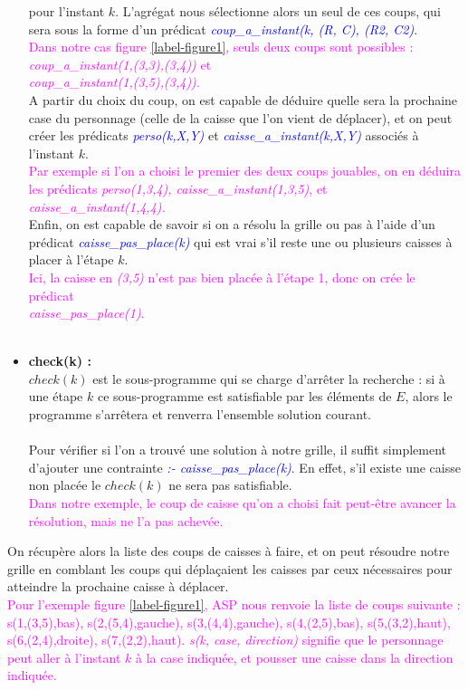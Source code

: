 \documentclass[10pt,a4paper]{article}
\begin{document}
\begin{itemize}
		pour l'instant $k$. L'agrégat nous sélectionne alors un seul de ces coups, qui sera sous la forme d'un prédicat \emph{\textcolor{blue}{coup\_a\_instant(k, (R, C), (R2, C2)}}.\\
		\textcolor{magenta}{Dans notre cas figure \ref{label-figure1}, seuls deux coups sont possibles : \emph{coup\_a\_instant(1,(3,3),(3,4))} et \\
		\emph{coup\_a\_instant(1,(3,5),(3,4)).}}\\
		A partir du choix du coup, on est capable de déduire quelle sera la prochaine case du personnage (celle de la caisse que l'on vient de déplacer), et on peut créer les prédicats 
		\emph{\textcolor{blue}{perso(k,X,Y)}} et \emph{\textcolor{blue}{caisse\_a\_instant(k,X,Y)}} associés à l'instant $k$.\\
		\textcolor{magenta}{Par exemple si l'on a choisi le premier des deux coups jouables, on en déduira les prédicats \emph{perso(1,3,4), caisse\_a\_instant(1,3,5)}, et \emph{caisse\_a\_instant(1,4,4).}}\\
		Enfin, on est capable de savoir si on a résolu la grille ou pas à l'aide d'un prédicat \emph{\textcolor{blue}{caisse\_pas\_place(k)}} qui est vrai s'il reste une ou plusieurs caisses à placer à l'étape $k$.\\
		\textcolor{magenta}{Ici, la caisse en \emph{(3,5)} n'est pas bien placée à l'étape 1, donc on crée le prédicat \\
		\emph{caisse\_pas\_place(1)}.}\\ \\
	\item \textbf{check(k) :}\\
		$check(k)$ est le sous-programme qui se charge d'arrêter la recherche : si à une étape $k$ ce sous-programme est satisfiable par les éléments de $E$, alors le programme s'arrêtera et renverra l'ensemble solution 
		courant.\\ \\
		Pour vérifier si l'on a trouvé une solution à notre grille, il suffit simplement d'ajouter une contrainte \emph{\textcolor{blue}{:- caisse\_pas\_place(k)}}. En effet, s'il existe une caisse non placée le 
		$check(k)$ ne sera pas satisfiable.\\
		\textcolor{magenta}{Dans notre exemple, le coup de caisse qu'on a choisi fait peut-être avancer la résolution, mais ne l'a pas achevée.}\\
\end{itemize}
On récupère alors la liste des coups de caisses à faire, et on peut résoudre notre grille en comblant les coups qui déplaçaient les caisses par ceux nécessaires pour atteindre la prochaine caisse à déplacer.\\
\textcolor{magenta}{Pour l'exemple figure \ref{label-figure1}, ASP nous renvoie la liste de coups suivante : s(1,(3,5),bas), s(2,(5,4),gauche), s(3,(4,4),gauche), s(4,(2,5),bas), s(5,(3,2),haut), s(6,(2,4),droite), s(7,(2,2),haut). 
\emph{s(k, case, direction)} signifie que le personnage peut aller à l'instant $k$ à la case indiquée, et pousser une caisse dans la direction indiquée.}
\end{document}
